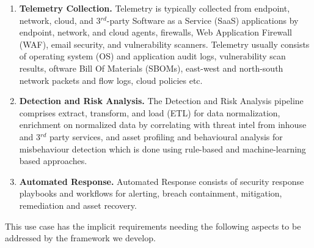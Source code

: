 \begin{enumerate}

\item{\bf Telemetry Collection.} Telemetry is typically collected from endpoint, 
network, cloud, and 3$^{rd}$-party Software as a Service (SaaS) applications by endpoint, network, and cloud agents, 
firewalls, Web Application Firewall (WAF), email security, and vulnerability scanners. Telemetry usually consists 
of operating system (OS) and application audit logs, vulnerability scan results, oftware Bill Of Materials (SBOMs), east-west and 
north-south network packets and flow logs, cloud policies etc.

\item{\bf Detection and Risk Analysis.} The Detection and Risk Analysis pipeline 
comprises  extract, transform, and load (ETL) for data normalization, enrichment on normalized data by correlating 
with threat intel from inhouse and 3$^{rd}$ party services, and asset profiling and
behavioural analysis for misbehaviour detection which is done using rule-based 
and machine-learning based approaches.

\item{\bf Automated Response.} Automated Response consists of security response 
playbooks and workflows for alerting, breach containment, mitigation, remediation 
and asset recovery.

\end{enumerate}

This use case has the implicit requirements needing the following
aspects to be addressed by the framework we develop.

